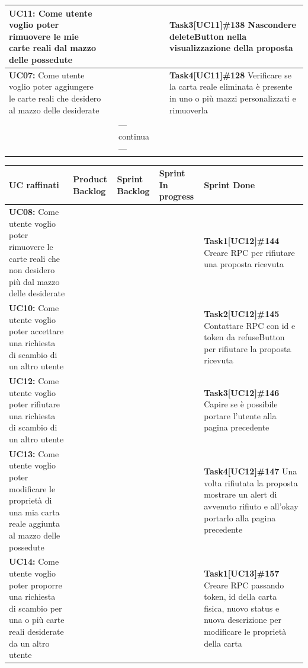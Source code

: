 \documentclass[a4paper, oneside]{article}
\begin{document}
\begin{landscape}
\begin{tabular}{ | p{7cm} | p{3cm} | p{2.8cm} | p{3cm} | p{7.2cm}| }
            \textbf{UC11:}  Come utente voglio poter rimuovere le mie carte reali dal mazzo delle possedute  & &  & & \textbf{Task3[UC11]\#138} Nascondere deleteButton nella visualizzazione della proposta   \\ \hline
            \textbf{UC07:}  Come utente voglio poter aggiungere le carte reali che desidero al mazzo delle desiderate   & &  & & \textbf{Task4[UC11]\#128} Verificare se la carta reale eliminata è presente in uno o più mazzi personalizzati e rimuoverla   \\ \hline
            & & --- continua --- & & \\
            \hline
        \end{tabular}
        \newpage
        \small
        \noindent
        \def\arraystretch{2}%
        \begin{tabular}{ | p{7cm} | p{3cm} | p{2.8cm} | p{3cm} | p{7.2cm}| }
            \hline
            \textbf{UC raffinati}
            & \textbf{Product Backlog}
            & \textbf{Sprint Backlog}
            & \textbf{Sprint In progress}
            & \textbf{Sprint Done} \\
            \hline
            \hline
            \textbf{UC08:}  Come utente voglio poter rimuovere le carte reali che non desidero più dal mazzo delle desiderate  & &  & & \textbf{Task1[UC12]\#144} Creare RPC per rifiutare una proposta ricevuta   \\ \hline
            \textbf{UC10:}  Come utente voglio poter accettare una richiesta di scambio di un altro utente  & &  & & \textbf{Task2[UC12]\#145} Contattare RPC con id e token da refuseButton per rifiutare la proposta ricevuta   \\ \hline
            \textbf{UC12:}  Come utente voglio poter rifiutare una richiesta di scambio di un altro utente  & &  & & \textbf{Task3[UC12]\#146} Capire se è possibile portare l'utente alla pagina precedente   \\ \hline
            \textbf{UC13:}  Come utente voglio poter modificare le proprietà di una mia carta reale aggiunta al mazzo delle possedute  & &  & & \textbf{Task4[UC12]\#147} Una volta rifiutata la proposta mostrare un alert di avvenuto rifiuto e all'okay portarlo alla pagina precedente   \\ \hline
            \textbf{UC14:}  Come utente voglio poter proporre una richiesta di scambio per una o più carte reali desiderate da un altro utente   & &  & & \textbf{Task1[UC13]\#157} Creare RPC passando token, id della carta fisica, nuovo status e nuova descrizione per modificare le proprietà della carta   \\ \hline

\end{tabular}
\end{landscape}
\end{document}
